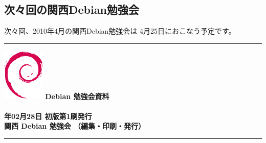 \documentclass[mingoth,a4paper]{jsarticle}
\newcommand{\debmtgyear}{2010}
\newcommand{\debmtgdate}{28}
\newcommand{\debmtgmonth}{02}
\begin{document}
\subsection{次々回の関西Debian勉強会}

次々回、2010年4月の関西Debian勉強会は 4月25日におこなう予定です。

\mbox{}\newpage

\printindex
 \cleartooddpage

 \begin{minipage}[b]{0.2\hsize}
 \end{minipage}
 \begin{minipage}[b]{0.8\hsize}

 \vspace*{15cm}
 \rule{\hsize}{1mm}
 \vspace{2mm}
 \includegraphics[width=2cm]{image200502/openlogo-nd.eps}
 \noindent \Large \bf Debian 勉強会資料\\ \\
 \noindent \normalfont \debmtgyear{}年\debmtgmonth{}月\debmtgdate{}日 \hspace{5mm}  初版第1刷発行\\
 \noindent \normalfont 関西 Debian 勉強会 （編集・印刷・発行）\\
 \rule{\hsize}{1mm}
 \end{minipage}
\end{document}
